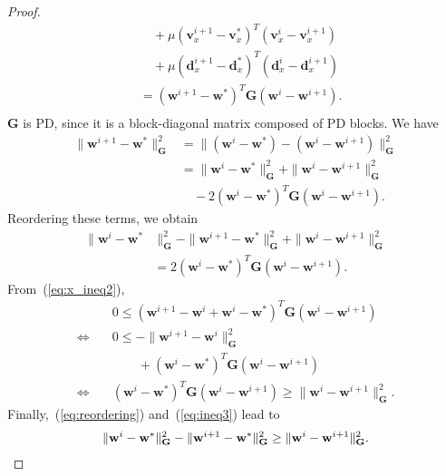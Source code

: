 \documentclass[10pt,twocolumn,twoside]{IEEEtran}
\newcommand{\vs}{\mathbf{v}} %
\newcommand{\dv}{\mathbf{d}} %
\newcommand{\wt}{\mathbf{w}} %
\newcommand{\G}{\mathbf{G}} %
\begin{document}
\begin{proof}
\begin{equation}
\begin{aligned}
	& \quad + \mu (\vs_x^{i+1} - \vs_x^*)^T (\vs_x^i - \vs_x^{i+1})\\
	& \quad + \mu (\dv_x^{i+1} - \dv_x^*)^T (\dv_x^i - \dv_x^{i+1})\\
	& = (\wt^{i+1} - \wt^*)^T \G (\wt^i - \wt^{i+1}). \\
	\end{aligned}
	\end{equation}
	$\G$ is PD, since it is a block-diagonal matrix composed of PD blocks. We have
	\begin{equation}
	\begin{aligned}
	\|\wt^{i+1} - \wt^*\|^2_{\G} &= \|(\wt^i - \wt^*) - (\wt^i - \wt^{i+1})\|^2_{\G}\\
	& = \|\wt^i - \wt^*\|^2_{\G} + \|\wt^i - \wt^{i+1}\|^2_{\G} \\
	& \quad - 2 (\wt^i - \wt^*)^T \G (\wt^i - \wt^{i+1}).
	\end{aligned}
	\end{equation}
	Reordering these terms, we obtain
	\begin{equation} \label{eq:reordering}
	\begin{aligned}
	\|\wt^i - \wt^*&\|^2_{\G} - \|\wt^{i+1}- \wt^*\|^2_{\G} +  \|\wt^i - \wt^{i+1}\|^2_{\G} \\
	& = 2 (\wt^i - \wt^*)^T \G (\wt^i - \wt^{i+1}).
	\end{aligned}
	\end{equation}
	From~(\ref{eq:x_ineq2}),
	\begin{align}
	&0 \leq (\wt^{i+1} - \wt^i + \wt^i - \wt^*)^T \G (\wt^i - \wt^{i+1}) \nonumber \\
	\Leftrightarrow \quad &0 \leq - \|\wt^{i+1} - \wt^i\|^2_{\G} \nonumber \\
	&\qquad + (\wt^i - \wt^*)^T \G (\wt^i - \wt^{i+1}) \nonumber \\
	\Leftrightarrow \quad &(\wt^i - \wt^*)^T \G (\wt^i - \wt^{i+1}) \geq  \|\wt^i - \wt^{i+1}\|^2_{\G}. \label{eq:ineq3}
	\end{align}
	Finally,~(\ref{eq:reordering}) and~(\ref{eq:ineq3}) lead to
	\begin{equation*}
	\begin{aligned}
	\|\wt^i - \wt^*\|^2_{\G} - \|\wt^{i+1} - \wt^*\|^2_{\G} \geq  \|\wt^i - \wt^{i+1}\|^2_{\G}.
	\qedhere
	\end{aligned}
	\end{equation*}
\end{proof}
\end{document}
